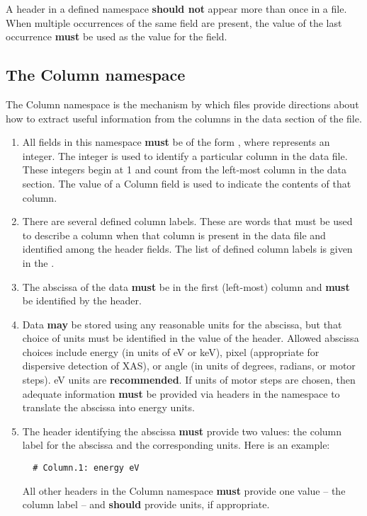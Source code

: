 \documentclass{article}
\begin{document}
A header in a defined namespace \textbf{should not} appear more than
once in a file.  When multiple occurrences of the same field are
present, the value of the last occurrence \textbf{must} be used as the
value for the field.

\subsection{The Column namespace}
\label{sec:columnnamespace}

The Column namespace is the mechanism by which {\xdi} files provide
directions about how to extract useful information from the columns in
the data section of the file.

\begin{enumerate}
\item All fields in this namespace \textbf{must} be of the form
  , where  represents an integer.  The
  integer is used to identify a particular column in the data
  file.  These integers begin at 1 and count from the left-most column
  in the data section.  The value of a Column field is used to indicate
  the contents of that column.
\item There are several defined column labels.  These are words that
  \textnormal{must} be used to describe a column when that column is
  present in the data file and identified among the header fields.
  The list of defined column labels is given in the
  {\DMD}.
\item The abscissa of the data \textbf{must} be in the first
  (left-most) column and \textbf{must} be identified by the
   header.
\item Data \textbf{may} be stored using any reasonable units for the
  abscissa, but that choice of units must be identified in the value
  of the  header.  Allowed abscissa choices include
  energy (in units of eV or keV), pixel (appropriate for dispersive
  detection of XAS), or angle (in units of degrees, radians, or motor
  steps).  eV units are \textbf{recommended}.  If units of motor steps
  are chosen, then adequate information \textbf{must} be provided via
  headers in the  namespace to translate the abscissa
  into energy units.
\item The header identifying the abscissa \textbf{must} provide two
  values: the column label for the abscissa and the corresponding
  units. Here is an example:
\begin{verbatim}
  # Column.1: energy eV
\end{verbatim}
  All other headers in the Column namespace \textbf{must} provide one
  value -- the column label -- and \textbf{should} provide units, if
  appropriate.
\end{enumerate}
\end{document}
